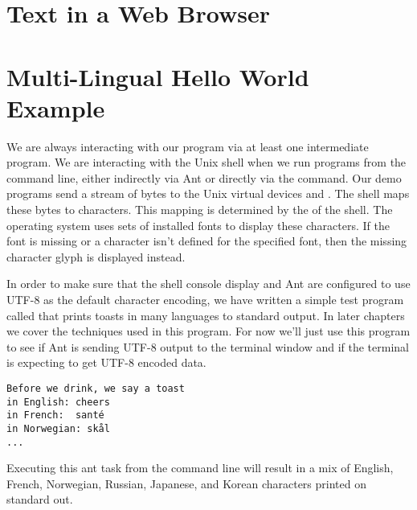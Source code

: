 \section{Text in a Web Browser}


\section{Multi-Lingual Hello World Example}\label{section:ant-console-config-utf8}

We are always interacting with our program via at least one intermediate program.
We are interacting with the Unix shell when we run programs from the command line,
either indirectly via Ant or directly via the  command.
Our demo programs send a stream of bytes to the Unix virtual devices
 and . 
The shell maps these bytes to characters.
This mapping is determined by the  of the shell.
The operating system uses sets of installed fonts to display these characters.
If the font is missing or a character isn't defined for the specified font,
then the missing character glyph is displayed instead.


In order to make sure that the shell console display and Ant are
configured to use UTF-8 as the default character encoding, we have written
a simple test program called  that prints toasts in many
languages to standard output.
In later chapters we cover the techniques used in this program.
For now we'll just use this program to see if
Ant is sending UTF-8 output to the terminal window and if the
terminal is expecting to get UTF-8 encoded data.
\begin{verbatim}
Before we drink, we say a toast 
in English: cheers  
in French:  santé
in Norwegian: skål
...
\end{verbatim}
Executing this ant task from the command line will result in a mix of
English, French, Norwegian, Russian, Japanese, and Korean characters
printed on standard out.

